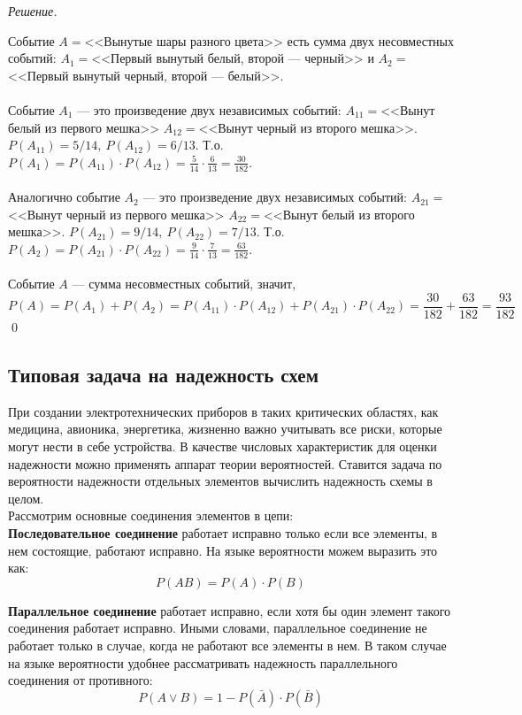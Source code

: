 \documentclass[12pt,a4paper]{article}
\theoremstyle{definition}
\theoremstyle{definition}
\theoremstyle{remark}
\theoremstyle{corollary}
\theoremstyle{bolditalic}
\newenvironment{solution}{
    \vspace{0.5em}
    \noindent\textit{Решение.}
}{\qed\vspace{1em}}
\begin{document}
\begin{solution}
    Событие $A=$<<Вынутые шары разного цвета>> есть сумма двух несовместных событий: $A_1=$<<Первый вынутый белый, второй --- черный>> и $A_2=$<<Первый вынутый черный, второй --- белый>>.\\\\
    Событие $A_1$ --- это произведение двух независимых событий: $A_{11}=$<<Вынут белый из первого мешка>> $A_{12}=$<<Вынут черный из второго мешка>>. $P(A_{11})=5/14,\ P(A_{12})=6/13$. Т.о. $P(A_1)=P(A_{11})\cdot P(A_{12}) = \frac{5}{14} \cdot \frac{6}{13} = \frac{30}{182} $.\\\\
    Аналогично событие $A_2$ --- это произведение двух независимых событий: $A_{21}=$<<Вынут черный из первого мешка>> $A_{22}=$<<Вынут белый из второго мешка>>. $P(A_{21})=9/14,\ P(A_{22})=7/13$. Т.о. $P(A_2)=P(A_{21})\cdot P(A_{22}) = \frac{9}{14} \cdot \frac{7}{13} = \frac{63}{182} $.\\\\
    Событие $A$ --- сумма несовместных событий, значит, 
    \[
    P(A)=P(A_1)+P(A_2)=P(A_{11})\cdot P(A_{12})+P(A_{21})\cdot P(A_{22})=\frac{30}{182}+\frac{63}{182}=\frac{93}{182}
    \]
\end{solution}

\subsection{Типовая задача на надежность схем}

При создании электротехнических приборов в таких критических областях, как медицина, авионика, энергетика, жизненно важно учитывать все риски, которые могут нести в себе устройства. В качестве числовых характеристик для оценки надежности можно применять аппарат теории вероятностей. Ставится задача по вероятности надежности отдельных элементов вычислить надежность схемы в целом.\\

Рассмотрим основные соединения элементов в цепи:\\

\textbf{Последовательное соединение} работает исправно только если все элементы, в нем состоящие, работают исправно. На языке вероятности можем выразить это как: \[
P(AB)=P(A)\cdot P(B)
\]


\textbf{Параллельное соединение} работает исправно, если хотя бы один элемент такого соединения работает исправно. Иными словами, параллельное соединение не работает только в случае, когда не работают все элементы в нем. В таком случае на языке вероятности удобнее рассматривать надежность параллельного соединения от противного:
\[
P(A \lor B) = 1 - P(\bar{A})\cdot P(\bar{B})
\]
\end{document}
